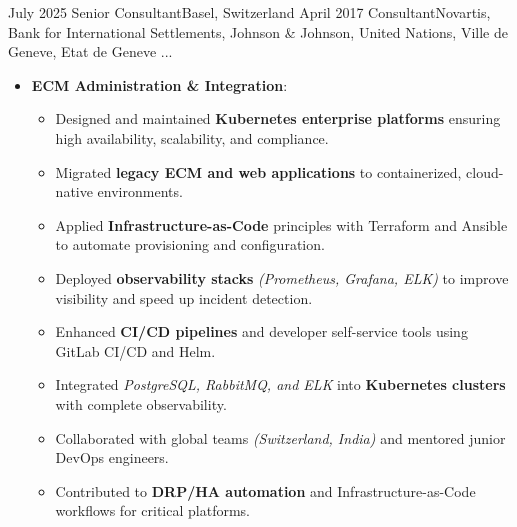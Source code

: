 
\begin{experiences}

\consultantexperience
    {July 2025} {Senior Consultant}{}{Basel, Switzerland}
    {April 2017}    {Consultant}{Novartis, Bank for International Settlements, Johnson \& Johnson, United Nations, Ville de Geneve, Etat de Geneve ...} {
        \begin{itemize}[left=0pt,label={},itemsep=0.5em]
        \vspace{0.5em}  %
          \item \textbf{ECM Administration \& Integration}:
            \begin{itemize}[itemsep=0.2em,topsep=0.2em,parsep=0pt]
              \small              
              \item Designed and maintained \textbf{Kubernetes enterprise platforms} ensuring high availability, scalability, and compliance.
              \item Migrated \textbf{legacy ECM and web applications} to containerized, cloud-native environments.
              \item Applied \textbf{Infrastructure-as-Code} principles with Terraform and Ansible to automate provisioning and configuration.
              \item Deployed \textbf{observability stacks} \emph{(Prometheus, Grafana, ELK)} to improve visibility and speed up incident detection.
              \item Enhanced \textbf{CI/CD pipelines} and developer self-service tools using GitLab CI/CD and Helm.
              \item Integrated \emph{PostgreSQL, RabbitMQ, and ELK} into \textbf{Kubernetes clusters} with complete observability.
              \item Collaborated with global teams \emph{(Switzerland, India)} and mentored junior DevOps engineers.
              \item Contributed to \textbf{DRP/HA automation} and Infrastructure-as-Code workflows for critical platforms.

            \end{itemize}


\end{itemize}}
\end{experiences}
